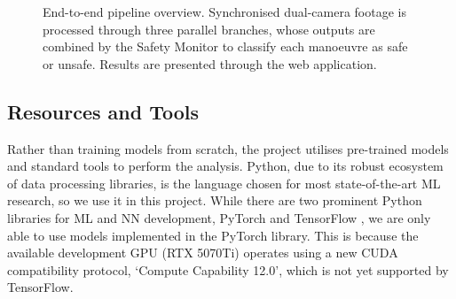 \documentclass{article}
\begin{document}
\begin{figure}[H]

\caption{End-to-end pipeline overview. Synchronised dual-camera footage is processed through three parallel branches, whose outputs are combined by the Safety Monitor to classify each manoeuvre as safe or unsafe. Results are presented through the web application.}
\label{fig:pipeline_overview}
\end{figure}

\subsection{Resources and Tools}
Rather than training models from scratch, the project utilises pre-trained models and standard tools to perform the analysis. Python, due to its robust ecosystem of data processing libraries, is the language chosen for most state-of-the-art ML research, so we use it in this project. While there are two prominent Python libraries for ML and NN development, PyTorch \cite{paszke2019pytorch} and TensorFlow \cite{abadi2016tensorflow}, we are only able to use models implemented in the PyTorch library. This is because the available development GPU (RTX 5070Ti) operates using a new CUDA compatibility protocol, `Compute Capability 12.0’, which is not yet supported by TensorFlow.
\end{document}
